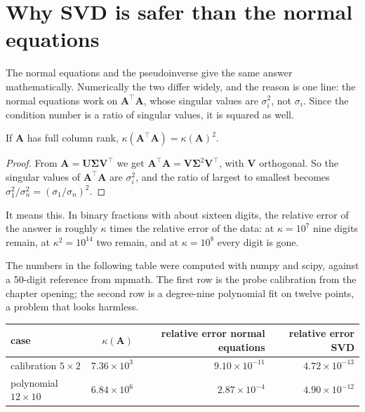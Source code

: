 \section{Why SVD is safer than the normal equations}

The normal equations and the pseudoinverse give the same answer mathematically. Numerically
the two differ widely, and the reason is one line: the normal equations work on
$\mathbf{A}^{\top}\mathbf{A}$, whose singular values are $\sigma_{i}^{2}$, not
$\sigma_{i}$. Since the condition number is a ratio of singular values, it is squared as well.

\begin{akibat}
If $\mathbf{A}$ has full column rank, $\kappa(\mathbf{A}^{\top}\mathbf{A})
=\kappa(\mathbf{A})^{2}$.
\end{akibat}

\begin{proof}
From $\mathbf{A}=\mathbf{U}\boldsymbol{\Sigma}\mathbf{V}^{\top}$ we get
$\mathbf{A}^{\top}\mathbf{A}=\mathbf{V}\boldsymbol{\Sigma}^{2}\mathbf{V}^{\top}$, with
$\mathbf{V}$ orthogonal. So the singular values of $\mathbf{A}^{\top}\mathbf{A}$ are
$\sigma_{i}^{2}$, and the ratio of largest to smallest becomes
$\sigma_{1}^{2}/\sigma_{n}^{2}=(\sigma_{1}/\sigma_{n})^{2}$.
\end{proof}

It means this. In binary fractions with about sixteen digits, the relative error of the
answer is roughly $\kappa$ times the relative error of the data: at $\kappa=10^{7}$ nine
digits remain, at $\kappa^{2}=10^{14}$ two remain, and at $\kappa=10^{8}$ every digit is
gone.

The numbers in the following table were computed with numpy and scipy, against a 50-digit reference
from mpmath. The first row is the probe calibration from the chapter opening; the second row is a
degree-nine polynomial fit on twelve points, a problem that looks
harmless.

\begin{center}
\begin{tabular}{lrrr}
\hline
case & $\kappa(\mathbf{A})$ & relative error normal equations & relative error SVD \\
\hline
calibration $5\times2$ & $7.36\times10^{3}$ & $9.10\times10^{-11}$ & $4.72\times10^{-13}$ \\
polynomial $12\times10$ & $6.84\times10^{6}$ & $2.87\times10^{-4}$ & $4.90\times10^{-12}$ \\
\hline
\end{tabular}
\end{center}

